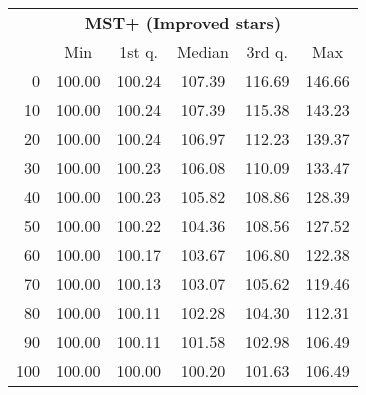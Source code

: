 \begin{tabular}{r|ccccc}
  \multicolumn{6}{c}{{\bf MST+ (Improved stars)}} \\
  & Min & 1st q. & Median & 3rd q. & Max \\ \hline\hline
  0 & 100.00 & 100.24 & 107.39 & 116.69 & 146.66
\\ 10 & 100.00 & 100.24 & 107.39 & 115.38 & 143.23
\\ 20 & 100.00 & 100.24 & 106.97 & 112.23 & 139.37
\\ 30 & 100.00 & 100.23 & 106.08 & 110.09 & 133.47
\\ 40 & 100.00 & 100.23 & 105.82 & 108.86 & 128.39
\\ 50 & 100.00 & 100.22 & 104.36 & 108.56 & 127.52
\\ 60 & 100.00 & 100.17 & 103.67 & 106.80 & 122.38
\\ 70 & 100.00 & 100.13 & 103.07 & 105.62 & 119.46
\\ 80 & 100.00 & 100.11 & 102.28 & 104.30 & 112.31
\\ 90 & 100.00 & 100.11 & 101.58 & 102.98 & 106.49
\\ 100 & 100.00 & 100.00 & 100.20 & 101.63 & 106.49
\end{tabular}
